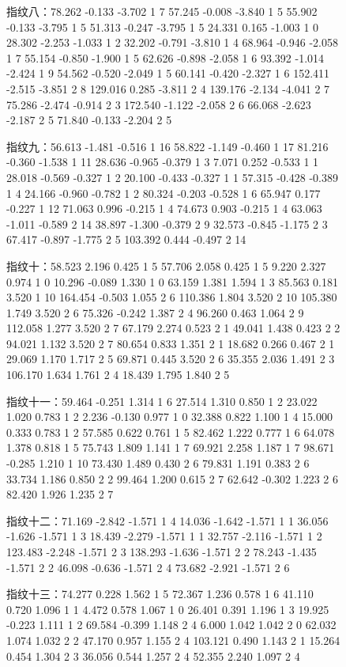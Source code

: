 \documentclass{whutmod}
\begin{document}
\begin{spacing}{1.2}
\begin{figure}[H]
指纹八：78.262 -0.133 -3.702 1 7
57.245 -0.008 -3.840 1 5
55.902 -0.133 -3.795 1 5
51.313 -0.247 -3.795 1 5
24.331 0.165 -1.003 1 0
28.302 -2.253 -1.033 1 2
32.202 -0.791 -3.810 1 4
68.964 -0.946 -2.058 1 7
55.154 -0.850 -1.900 1 5
62.626 -0.898 -2.058 1 6
93.392 -1.014 -2.424 1 9
54.562 -0.520 -2.049 1 5
60.141 -0.420 -2.327 1 6
152.411 -2.515 -3.851 2 8
129.016 0.285 -3.811 2 4
139.176 -2.134 -4.041 2 7
75.286 -2.474 -0.914 2 3
172.540 -1.122 -2.058 2 6
66.068 -2.623 -2.187 2 5
71.840 -0.133 -2.204 2 5


指纹九：56.613 -1.481 -0.516 1 16
58.822 -1.149 -0.460 1 17
81.216 -0.360 -1.538 1 11
28.636 -0.965 -0.379 1 3
7.071 0.252 -0.533 1 1
28.018 -0.569 -0.327 1 2
20.100 -0.433 -0.327 1 1
57.315 -0.428 -0.389 1 4
24.166 -0.960 -0.782 1 2
80.324 -0.203 -0.528 1 6
65.947 0.177 -0.227 1 12
71.063 0.996 -0.215 1 4
74.673 0.903 -0.215 1 4
63.063 -1.011 -0.589 2 14
38.897 -1.300 -0.379 2 9
32.573 -0.845 -1.175 2 3
67.417 -0.897 -1.775 2 5
103.392 0.444 -0.497 2 14


指纹十：58.523 2.196 0.425 1 5
57.706 2.058 0.425 1 5
9.220 2.327 0.974 1 0
10.296 -0.089 1.330 1 0
63.159 1.381 1.594 1 3
85.563 0.181 3.520 1 10
164.454 -0.503 1.055 2 6
110.386 1.804 3.520 2 10
105.380 1.749 3.520 2 6
75.326 -0.242 1.387 2 4
96.260 0.463 1.064 2 9
112.058 1.277 3.520 2 7
67.179 2.274 0.523 2 1
49.041 1.438 0.423 2 2
94.021 1.132 3.520 2 7
80.654 0.833 1.351 2 1
18.682 0.266 0.467 2 1
29.069 1.170 1.717 2 5
69.871 0.445 3.520 2 6
35.355 2.036 1.491 2 3
106.170 1.634 1.761 2 4
18.439 1.795 1.840 2 5

指纹十一：59.464 -0.251 1.314 1 6
27.514 1.310 0.850 1 2
23.022 1.020 0.783 1 2
2.236 -0.130 0.977 1 0
32.388 0.822 1.100 1 4
15.000 0.333 0.783 1 2
57.585 0.622 0.761 1 5
82.462 1.222 0.777 1 6
64.078 1.378 0.818 1 5
75.743 1.809 1.141 1 7
69.921 2.258 1.187 1 7
98.671 -0.285 1.210 1 10
73.430 1.489 0.430 2 6
79.831 1.191 0.383 2 6
33.734 1.186 0.850 2 2
99.464 1.200 0.615 2 7
62.642 -0.302 1.223 2 6
82.420 1.926 1.235 2 7

指纹十二：71.169 -2.842 -1.571 1 4
14.036 -1.642 -1.571 1 1
36.056 -1.626 -1.571 1 3
18.439 -2.279 -1.571 1 1
32.757 -2.116 -1.571 1 2
123.483 -2.248 -1.571 2 3
138.293 -1.636 -1.571 2 2
78.243 -1.435 -1.571 2 2
46.098 -0.636 -1.571 2 4
73.682 -2.921 -1.571 2 6


指纹十三：74.277 0.228 1.562 1 5
72.367 1.236 0.578 1 6
41.110 0.720 1.096 1 1
4.472 0.578 1.067 1 0
26.401 0.391 1.196 1 3
19.925 -0.223 1.111 1 2
69.584 -0.399 1.148 2 4
6.000 1.042 1.042 2 0
62.032 1.074 1.032 2 2
47.170 0.957 1.155 2 4
103.121 0.490 1.143 2 1
15.264 0.454 1.304 2 3
36.056 0.544 1.257 2 4
52.355 2.240 1.097 2 4



\end{figure}
\end{spacing}
\end{document}
